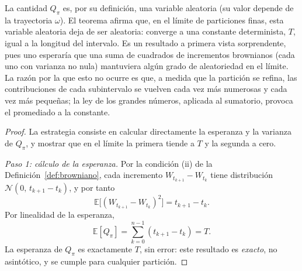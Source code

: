 \documentclass[11pt,a4paper,oneside]{report}
\theoremstyle{plain}
\theoremstyle{definition}
\theoremstyle{remark}
\newcommand{\E}{\mathbb{E}}
\newcommand{\1}{\mathbf{1}}
\begin{document}
La cantidad $Q_\pi$ es, por su definición, una variable
aleatoria (su valor depende de la trayectoria $\omega$). El teorema
afirma que, en el límite de particiones finas, esta variable aleatoria
deja de ser aleatoria: converge a una constante determinista, $T$,
igual a la longitud del intervalo. Es un resultado a primera vista
sorprendente, pues uno esperaría que una suma de cuadrados de
incrementos brownianos (cada uno con varianza no nula) mantuviera
algún grado de aleatoriedad en el límite. La razón por la que esto no
ocurre es que, a medida que la partición se refina, las contribuciones
de cada subintervalo se vuelven cada vez más numerosas y cada vez más
pequeñas; la ley de los grandes números, aplicada al sumatorio,
provoca el promediado a la constante.

\begin{proof}
La estrategia consiste en calcular directamente la esperanza y la
varianza de $Q_\pi$, y mostrar que en el límite la primera tiende a
$T$ y la segunda a cero.

\emph{Paso 1: cálculo de la esperanza.} Por la condición (ii) de la
Definición~\ref{def:browniano}, cada incremento $W_{t_{k+1}} - W_{t_k}$
tiene distribución $\mathcal{N}(0,\, t_{k+1} - t_k)$, y por tanto
\begin{equation*}
  \E\bigl[(W_{t_{k+1}} - W_{t_k})^2\bigr] = t_{k+1} - t_k.
\end{equation*}
Por linealidad de la esperanza,
\begin{equation}\label{eq:esperanza_Q_pi}
  \E[Q_\pi] = \sum_{k=0}^{n-1} (t_{k+1} - t_k) = T.
\end{equation}
La esperanza de $Q_\pi$ es exactamente $T$, sin error: este resultado
es \emph{exacto}, no asintótico, y se cumple para cualquier partición.


\end{proof}
\end{document}
